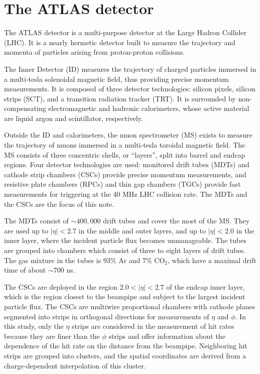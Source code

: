 \section{The ATLAS detector}
\label{sec:detector}

The ATLAS detector is a multi-purpose detector at the Large Hadron Collider (LHC). It is a nearly hermetic detector built to measure the trajectory and momenta of particles arising from proton-proton collisions. 

The Inner Detector (ID) measures the trajectory of charged particles immersed in a multi-tesla solenoidal magnetic field, thus providing precise momentum measurements. It is composed of three detector technologies: silicon pixels, silicon strips (SCT), and a transition radiation tracker (TRT). It is surrounded by non-compensating electromagnetic and hadronic calorimeters, whose active material are liquid argon and scintillator, respectively.

Outside the ID and calorimeters, the muon spectrometer (MS) exists to measure the trajectory of muons immersed in a multi-tesla toroidal magnetic field. The MS consists of three concentric shells, or ``layers'', split into barrel and endcap regions. Four detector technologies are used: monitored drift tubes (MDTs) and cathode strip chambers (CSCs) provide precise momentum measurements, and resistive plate chambers (RPCs) and thin gap chambers (TGCs) provide fast measurements for triggering at the 40 MHz LHC collision rate. The MDTs and the CSCs are the focus of this note.

The MDTs consist of $\sim\!400,000$ drift tubes and cover the most of the MS. They are used up to $|\eta| < 2.7$ in the middle and outer layers, and up to $|\eta| < 2.0$ in the inner layer, where the incident particle flux becomes unmanageable. The tubes are grouped into chambers which consist of three to eight layers of drift tubes. The gas mixture in the tubes is 93\% Ar and 7\% $\text{CO}_2$, which have a maximal drift time of about $\sim\!700$ ns.

The CSCs are deployed in the region $2.0 < |\eta| < 2.7$ of the endcap inner layer, which is the region closest to the beampipe and subject to the largest incident particle flux. The CSCs are multiwire proportional chambers with cathode planes segmented into strips in orthogonal directions for measurements of $\eta$ and $\phi$. In this study, only the $\eta$ strips are considered in the measurement of hit rates because they are finer than the $\phi$ strips and offer information about the dependence of the hit rate on the distance from the beampipe. Neighboring hit strips are grouped into clusters, and the spatial coordinates are derived from a charge-dependent interpolation of this cluster.

